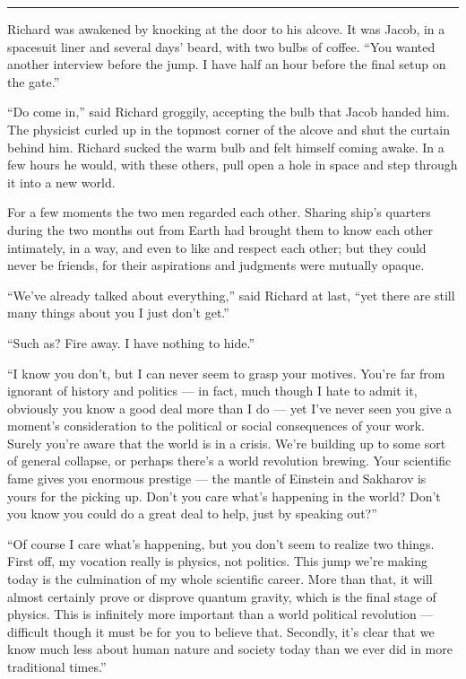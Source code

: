 \documentclass[english,11pt,letterpaper,onecolumn]{scrbook}
\begin{document}
\begin{center}\rule[3pt]{2in}{0.5pt}\end{center}

	Richard was awakened by knocking at the door to his alcove.  It was Jacob, in a spacesuit liner and several days' beard, with two bulbs of coffee.  ``You wanted another interview before the jump.  I have half an hour before the final setup on the gate.''

	``Do come in,'' said Richard groggily, accepting the bulb that Jacob handed him.  The physicist curled up in the topmost corner of the alcove and shut the curtain behind him.  Richard sucked the warm bulb and felt himself coming awake.  In a few hours he would, with these others, pull open a hole in space and step through it into a new world.

	For a few moments the two men regarded each other.  Sharing ship's quarters during the two months out from Earth had brought them to know each other intimately, in a way, and even to like and respect each other; but they could never be friends, for their aspirations and judgments were mutually opaque.

	``We've already talked about everything,'' said Richard at last, ``yet there are still many things about you I just don't get.''

	``Such as?  Fire away.  I have nothing to hide.''

	``I know you don't, but I can never seem to grasp your motives.  You're far from ignorant of history and politics --- in fact, much though I hate to admit it, obviously you know a good deal more than I do --- yet I've never seen you give a moment's consideration to the political or social consequences of your work.  Surely you're aware that the world is in a crisis.  We're building up to some sort of general collapse, or perhaps there's a world revolution brewing.  Your scientific fame gives you enormous prestige --- the mantle of Einstein and Sakharov is yours for the picking up.  Don't you care what's happening in the world?  Don't you know you could do a great deal to help, just by speaking out?''

	``Of course I care what's happening, but you don't seem to realize two things.  First off, my vocation really is physics, not politics.  This jump we're making today is the culmination of my whole scientific career.  More than that, it will almost certainly prove or disprove quantum gravity, which is the final stage of physics.  This is infinitely more important than a world political revolution --- difficult though it must be for you to believe that.  Secondly, it's clear that we know much less about human nature and society today than we ever did in more traditional times.''
\end{document}
